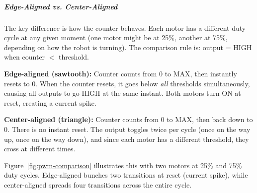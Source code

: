 \subparagraph{Edge-Aligned vs. Center-Aligned}
The key difference is how the counter behaves. Each motor has a different duty cycle at any given moment (one motor might be at 25\%, another at 75\%, depending on how the robot is turning). The comparison rule is: output = HIGH when counter $<$ threshold.

\textbf{Edge-aligned (sawtooth):} Counter counts from 0 to MAX, then instantly resets to 0. When the counter resets, it goes below \textit{all} thresholds simultaneously, causing all outputs to go HIGH at the same instant. Both motors turn ON at reset, creating a current spike.

\textbf{Center-aligned (triangle):} Counter counts from 0 to MAX, then back down to 0. There is no instant reset. The output toggles twice per cycle (once on the way up, once on the way down), and since each motor has a different threshold, they cross at different times.

Figure~\ref{fig:pwm-comparison} illustrates this with two motors at 25\% and 75\% duty cycles. Edge-aligned bunches two transitions at reset (current spike), while center-aligned spreads four transitions across the entire cycle.

